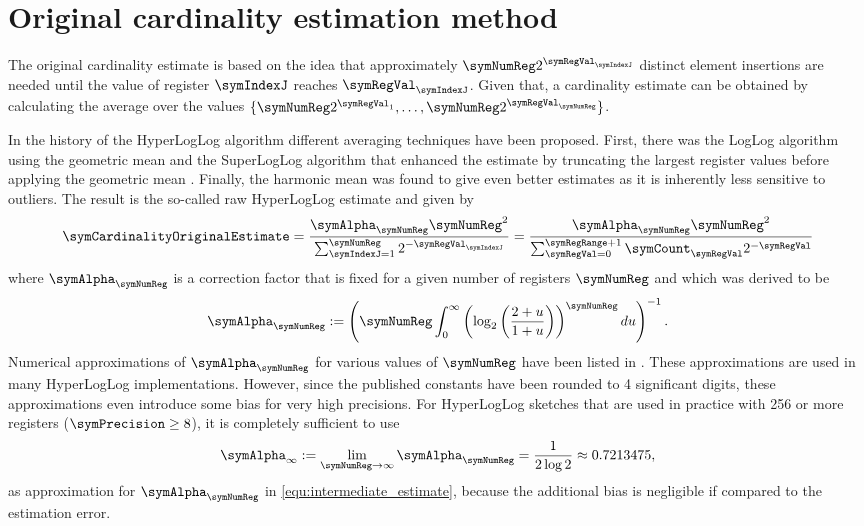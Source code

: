\documentclass[a4paper]{scrartcl}
\begin{document}
\section{Original cardinality estimation method}
\label{sec:cardinality_estimation}
The original cardinality estimate \cite{Flajolet2007} is based on the idea that approximately $\symNumReg  2^{\symRegVal_\symIndexJ}$ distinct element insertions are needed until the value of register $\symIndexJ$ reaches $\symRegVal_\symIndexJ$. Given that, a cardinality estimate can be obtained by calculating the average over the values $\lbrace \symNumReg 2^{\symRegVal_1},\ldots,\symNumReg2^{\symRegVal_\symNumReg}\rbrace$. 

In the history of the HyperLogLog algorithm different averaging techniques have been proposed. First, there was the LogLog algorithm using the geometric mean and the SuperLogLog algorithm that enhanced the estimate by truncating the largest register values before applying the geometric mean \cite{Durand2003}. Finally, the harmonic mean was found to give even better estimates as it is inherently less sensitive to outliers. The result is the so-called raw HyperLogLog estimate and given by
\begin{equation}
\label{equ:intermediate_estimate}
\symCardinalityOriginalEstimate
= 
\frac{\symAlpha_\symNumReg \symNumReg^2}{\sum_{\symIndexJ=1}^{\symNumReg}2^{-\symRegVal_\symIndexJ}}
= 
\frac{\symAlpha_\symNumReg \symNumReg^2}{\sum_{\symRegVal=0}^{\symRegRange+1}\symCount_\symRegVal 2^{-\symRegVal}}
\end{equation}
where $\symAlpha_\symNumReg$  is a correction factor that is fixed for a given number of registers $\symNumReg$ and which was derived to be \cite{Flajolet2007}
\begin{equation}
\symAlpha_\symNumReg := \left(
\symNumReg
\int_0^\infty
\left(
\log_2\left(
\frac{2+u}{1+u}
\right)
\right)^\symNumReg
du
\right)^{-1}.
\end{equation}
Numerical approximations of $\symAlpha_\symNumReg$ for various values of $\symNumReg$ have been listed in \cite{Flajolet2007}. These approximations are used in many HyperLogLog implementations. However, since the published constants have been rounded to 4 significant digits, these approximations even introduce some bias for very high precisions. For HyperLogLog sketches that are used in practice with 256 or more registers ($\symPrecision\geq 8$), it is completely sufficient to use 
\begin{equation}
\label{equ:alpha_inf}
\symAlpha_\infty := \lim_{\symNumReg\rightarrow\infty} \symAlpha_\symNumReg = \frac{1}{2\log 2} \approx 0.7213475,
\end{equation}
as approximation for $\symAlpha_\symNumReg$ in \eqref{equ:intermediate_estimate}, because the additional bias is negligible if compared to the estimation error.
\end{document}
